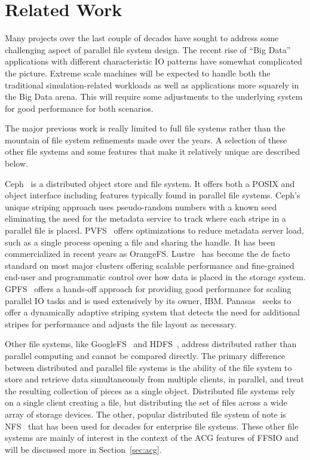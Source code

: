 \documentclass{sig-alt-gov2}
\begin{document}
\section{Related Work}
\label{sec:related}

Many projects over the last couple of decades have sought to address some
challenging aspect of parallel file system design. The recent rise of ``Big
Data'' applications with different characteristic IO patterns have somewhat
complicated the picture. Extreme scale machines will be expected to handle both
the traditional simulation-related workloads as well as applications more
squarely in the Big Data arena. This will require some adjustments to the
underlying system for good performance for both scenarios.

The major previous work is really limited to full file systems rather than the
mountain of file system refinements made over the years. A selection of these
other file systems and some features that make it relatively unique are
described below.

Ceph~\cite{weil:ceph} is a distributed object store and file system. It offers
both a POSIX and object interface including features typically found in parallel
file systems.
Ceph's unique striping approach uses pseudo-random numbers with a
known seed eliminating the need for the metadata service to track where each
stripe in a parallel file is placed.
PVFS~\cite{carns:pvfs} offers optimizations to reduce metadata server load,
such as a single process opening a file and sharing the handle.
It has been
commercialized in recent years as OrangeFS.
Lustre~\cite{braam:lustre-arch} has become the de facto standard on most major
clusters offering scalable performance and fine-grained end-user and
programmatic control over how data is placed in the storage system.
GPFS~\cite{schmuck:gpfs} offers a hands-off approach for providing good
performance for scaling parallel IO tasks and is used extensively by its owner,
IBM.
Panasas~\cite{panasas:architecture} seeks to offer a dynamically adaptive
striping system that detects the need for additional stripes for performance
and adjusts the file layout as necessary.

Other file systems, like GoogleFS~\cite{ghemawat:googlefs} and
HDFS~\cite{Shvachko:2010:hdfs}, address distributed rather than parallel
computing and cannot be compared directly.
The primary difference between
distributed and parallel file systems is the ability of the file system to
store and retrieve data simultaneously from multiple clients, in parallel, and
treat the resulting collection of pieces as a single object.  Distributed file
systems rely on a single client creating a file, but distributing the set of
files across a wide array of storage devices.
The other, popular distributed
file system of note is NFS~\cite{powlowski:1994:nfs3} that has been used for
decades for enterprise file systems.
These other file systems are mainly of
interest in the context of the ACG features of FFSIO and will be discussed more
in Section~\ref{sec:acg}.
\end{document}
